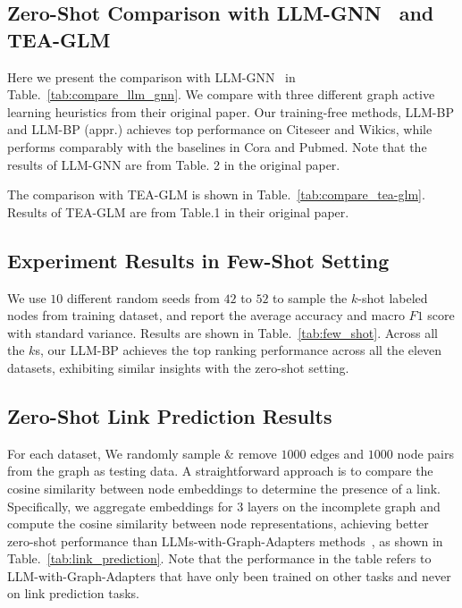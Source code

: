 %

\subsection{Zero-Shot Comparison with LLM-GNN~\cite{chen2023label} and TEA-GLM~\cite{wang2024llms}}
\label{sec:app_more_baselines}


Here we present the comparison with LLM-GNN~\cite{chen2023label} in Table.~\ref{tab:compare_llm_gnn}. We compare with three different graph active learning heuristics from their original paper. Our training-free methods, LLM-BP and LLM-BP (appr.) achieves top performance on Citeseer and Wikics, while performs comparably with the baselines in Cora and Pubmed. Note that the results of LLM-GNN are from Table. 2 in the original paper.


The comparison with TEA-GLM is shown in Table.~\ref{tab:compare_tea-glm}. Results of TEA-GLM are from Table.1 in their original paper.

\subsection{Experiment Results in Few-Shot Setting}
\label{sec:app_few_shot}
We use $10$ different random seeds from $42$ to $52$ to sample the $k$-shot labeled nodes from training dataset, and report the average accuracy and macro $F1$ score with standard variance. Results are shown in Table.~\ref{tab:few_shot}. Across all the $k$s, our LLM-BP achieves the top ranking performance across all the eleven datasets, exhibiting similar insights with the zero-shot setting.


\subsection{Zero-Shot Link Prediction Results}

\label{sec:app_link_prediction}

For each dataset, We randomly sample \& remove $1000$ edges and $1000$ node pairs from the graph as testing data. A straightforward approach is to compare the cosine similarity between node embeddings to determine the presence of a link. Specifically, we aggregate embeddings for $3$ layers on the incomplete graph and compute the cosine similarity between node representations, achieving better zero-shot performance than LLMs-with-Graph-Adapters methods~\cite{wang2024llms, chen2024llaga, tang2024graphgpt}, as shown in Table.~\ref{tab:link_prediction}. Note that the performance in the table refers to LLM-with-Graph-Adapters that have only been trained on other tasks and never on link prediction tasks.

